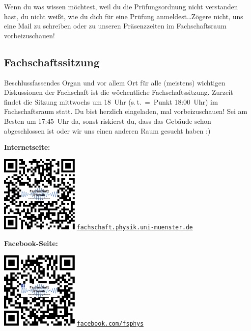 \begin{multicols}{2}
Wenn du was wissen möchtest, weil du die Prüfungsordnung nicht verstanden hast, du nicht weißt, wie du dich für eine Prüfung anmeldest\dots Zögere nicht, uns eine Mail zu schreiben oder zu unseren Präsenzzeiten im Fachschaftsraum vorbeizuschauen!

\subsection*{Fachschaftssitzung}
Beschlussfassendes Organ und vor allem Ort für alle (meistens) wichtigen Diskussionen  der Fachschaft ist die wöchentliche Fachschaftssitzung. Zurzeit findet die Sitzung mittwochs um 18~Uhr (s.\,t.~=~Punkt 18:00~Uhr) im Fachschaftsraum statt.
Du bist herzlich eingeladen, mal vorbeizuschauen! Sei am Besten um 17:45~Uhr da, sonst riskierst du, dass das Gebäude schon abgeschlossen ist oder wir uns einen anderen Raum gesucht haben :)

\begin{minipage}{\columnwidth}
	\begin{minipage}[t]{5cm}
	\raggedright\parskip=0.1cm
	\textbf{Internetseite:}

	\includegraphics[width=3.8cm]{res/fsphys_qrcode_homepage.png}
	\scriptsize
	\href{https://www.uni-muenster.de/Physik.FSPHYS}{\texttt{fachschaft.physik.uni-muenster.de}}
	\end{minipage}
	\hfill
	\begin{minipage}[t]{4cm}
	\raggedleft\parskip=0.1cm
	\textbf{Facebook-Seite:}

	\includegraphics[width=3.8cm]{res/fsphys_qrcode_facebook.png}
	\scriptsize
	\href{https://facebook.com/fsphys}{\texttt{facebook.com/fsphys}}
	\end{minipage}
\end{minipage}
\end{multicols}

